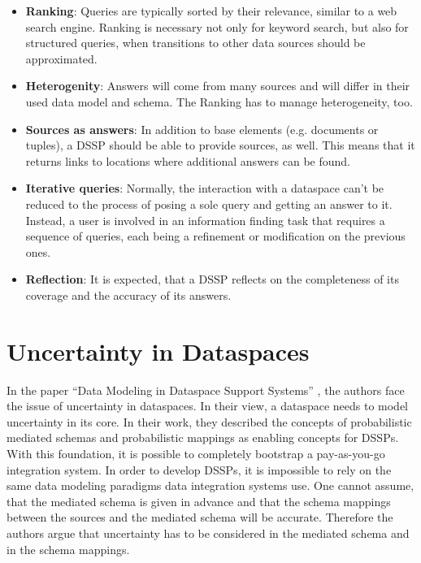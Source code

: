 \begin{itemize}
\item \textbf{Ranking}: Queries are typically sorted by their relevance, similar to a web search engine. Ranking is necessary not only for keyword search, but also for structured queries, when transitions to other data sources should be approximated.  

\item \textbf{Heterogenity}: Answers will come from many sources and will differ in their used data model and schema. The Ranking has to manage heterogeneity, too.

\item \textbf{Sources as answers}: In addition to base elements (e.g. documents or tuples), a DSSP should be able to provide sources, as well. This means that it returns links to locations where additional answers can be found.

\item \textbf{Iterative queries}: Normally, the interaction with a dataspace can't be reduced to the process of posing  a sole query and getting an answer to it. Instead, a user is involved in an information finding task that requires a sequence of queries, each being a refinement or modification on the previous ones.

\item \textbf{Reflection}: It is expected, that a DSSP reflects on the completeness of its coverage and the accuracy of its answers. 
\end{itemize}


\section{Uncertainty in Dataspaces}
 
In the paper ``Data Modeling in Dataspace Support Systems'' \cite{DBLP:conf/birthday/SarmaDH09}, the authors face the issue of uncertainty in dataspaces. In their view, a dataspace needs to model uncertainty in its core. In their work, they described the concepts of probabilistic mediated schemas and probabilistic mappings as enabling concepts for DSSPs. With this foundation, it is possible to completely bootstrap a pay-as-you-go integration system. 
In order to develop DSSPs, it is impossible to rely on the same data modeling paradigms data integration systems use. One cannot assume, that the mediated schema is given in advance and that the schema mappings between the sources and the mediated schema will be accurate. Therefore the authors argue that uncertainty has to be considered in the mediated schema and in the schema mappings.

